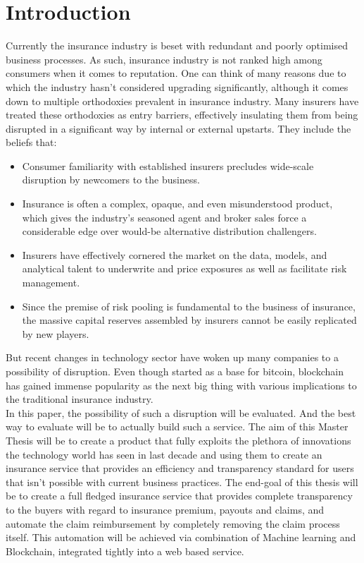 \chapter{Introduction}

Currently the insurance industry is beset with redundant and poorly optimised business processes. As such, insurance industry is not ranked high among consumers when it comes to reputation\cite{lauraMazzucaToops2014HarrisPropertyCasualty360}. One can think of many reasons due to which the industry hasn't considered upgrading significantly, although it comes down to multiple orthodoxies prevalent in insurance industry. Many insurers have treated these orthodoxies as entry barriers, effectively insulating them from being disrupted in a significant way by internal or external upstarts. They include the beliefs that\cite{Shaw2016InsurersDisrupted}:
\begin{itemize}
    \item Consumer familiarity with established insurers precludes wide-scale disruption by newcomers to the business.
    \item Insurance is often a complex, opaque, and even misunderstood product, which gives the industry's seasoned agent and broker sales force a considerable edge over would-be alternative distribution challengers.
    \item Insurers have effectively cornered the market on the data, models, and analytical talent to underwrite and price exposures as well as facilitate risk management.
    \item Since the premise of risk pooling is fundamental to the business of insurance, the massive capital reserves assembled by insurers cannot be easily replicated by new players.
\end{itemize}

But recent changes in technology sector have woken up many companies to a possibility of disruption. Even though started as a base for bitcoin, blockchain has gained immense popularity as the next big thing with various implications to the traditional insurance industry.
\\ In this paper, the possibility of such a disruption will be evaluated. And the best way to evaluate will be to actually build such a service. The aim of this Master Thesis will be to create a product that fully exploits the plethora of innovations the technology world has seen in last decade and using them to create an insurance service that provides an efficiency and transparency standard for users that isn't possible with current business practices. The end-goal of this thesis will be to create a full fledged insurance service that provides complete transparency to the buyers with regard to insurance premium, payouts and claims, and automate the claim reimbursement by completely removing the claim process itself. This automation will be achieved via combination of Machine learning and Blockchain, integrated tightly into a web based service.

